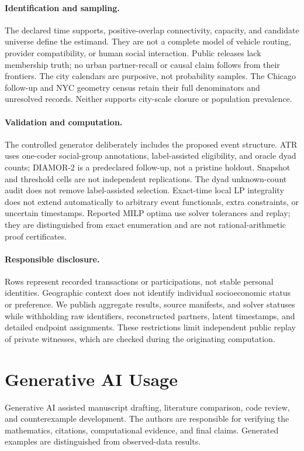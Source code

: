 \paragraph{Identification and sampling.}
The declared time supports, positive-overlap connectivity, capacity, and
candidate universe define the estimand. They are not a complete model of
vehicle routing, provider compatibility, or human social interaction.
Public releases lack membership truth; no urban partner-recall or causal
claim follows from their frontiers. The city calendars are purposive, not
probability samples. The Chicago follow-up and NYC geometry census retain
their full denominators and unresolved records. Neither supports city-scale
closure or population prevalence.

\paragraph{Validation and computation.}
The controlled generator deliberately includes the proposed event structure.
ATR uses one-coder social-group annotations, label-assisted eligibility, and
oracle dyad counts; DIAMOR-2 is a predeclared follow-up, not a pristine holdout.
Snapshot and threshold cells are not independent replications. The dyad
unknown-count audit does not remove label-assisted selection. Exact-time
local LP integrality does not extend automatically to arbitrary event
functionals, extra constraints, or uncertain timestamps. Reported MILP
optima use solver tolerances and replay; they are distinguished from exact
enumeration and are not rational-arithmetic proof certificates.

\paragraph{Responsible disclosure.}
Rows represent recorded transactions or participations, not stable personal
identities. Geographic context does not identify individual socioeconomic
status or preference. We publish aggregate results, source manifests, and
solver statuses while withholding raw identifiers, reconstructed partners,
latent timestamps, and detailed endpoint assignments. These restrictions
limit independent public replay of private witnesses, which are checked during
the originating computation.

\section{Generative AI Usage}
Generative AI assisted manuscript drafting, literature comparison, code review,
and counterexample development. The authors are responsible for verifying the
mathematics, citations, computational evidence, and final claims. Generated
examples are distinguished from observed-data results.

